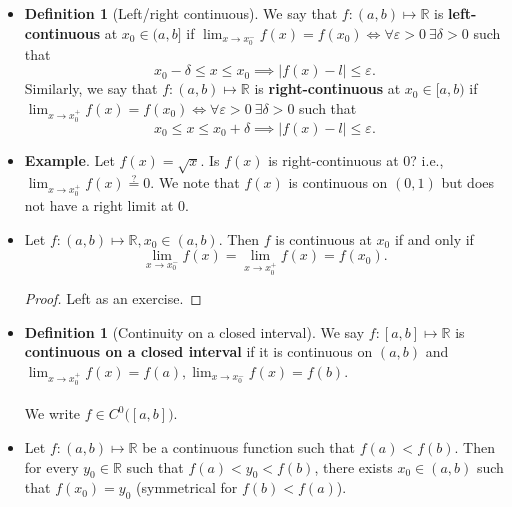 \documentclass{article}
\newcommand{\R}{\mathbb{R}}
\newcommand{\?}{\stackrel{?}{=}}
\theoremstyle{definition} %
\newtheorem{definition}[subsection]{Definition} %
\begin{document}
\begin{itemize}
\begin{definition}[Left/right limits]
              We write $\lim_{x \to x_0^+} f(x) = x_0$.
          \end{definition}
    \item[]
          \begin{definition}[Left/right continuous]
              We say that $f: (a, b) \mapsto \R$ is \textbf{left-continuous} at $x_0 \in (a, b]$ if $\lim_{x \to x_0^-} f(x) = f(x_0) \iff \forall \varepsilon > 0 \ \exists \delta > 0$ such that
              $$x_0 - \delta \leq x \leq x_0 \implies |f(x) - l| \leq \varepsilon.$$
              Similarly, we say that $f: (a, b) \mapsto \R$ is \textbf{right-continuous} at $x_0 \in [a, b)$ if $\lim_{x \to x_0^+} f(x) = f(x_0) \iff \forall \varepsilon > 0 \ \exists \delta > 0$ such that
              $$x_0 \leq x \leq x_0 + \delta \implies |f(x) - l| \leq \varepsilon.$$
          \end{definition}
    \item \textbf{Example}. Let $f(x) = \sqrt{x}$. Is $f(x)$ is right-continuous at 0? i.e., $\lim_{x \to x_0^+} f(x) \overset{?}{=} 0$. We note that $f(x)$ is continuous on $(0, 1)$ but does not have a right limit at 0.
    \item[]
          \begin{lemma}
              Let $f: (a, b) \mapsto \R, x_0 \in (a, b)$. Then $f$ is continuous at $x_0$ if and only if
              $$\lim_{x \to x_0^-} f(x) = \lim_{x \to x_0^+} f(x) = f(x_0).$$
          \end{lemma}
          \begin{proof}
              Left as an exercise.
          \end{proof}
    \item[]
          \begin{definition}[Continuity on a closed interval]
              We say $f: [a, b] \mapsto \R$ is \textbf{continuous on a closed interval} if it is continuous on $(a, b)$ and $\lim_{x \to x_0^+} f(x) = f(a), \lim_{x \to x_0^-} f(x) = f(b)$. \\\\
              We write $f \in C^0\big([a, b]\big)$.
          \end{definition}
    \item[]
          \begin{theorem}
              Let $f: (a, b) \mapsto \R$ be a continuous function such that $f(a) < f(b)$. Then for every $y_0 \in \R$ such that $f(a) < y_0 < f(b)$, there exists $x_0 \in (a, b)$ such that $f(x_0) = y_0$ (symmetrical for $f(b) < f(a)$). \\\\

\end{theorem}
\end{itemize}
\end{document}
